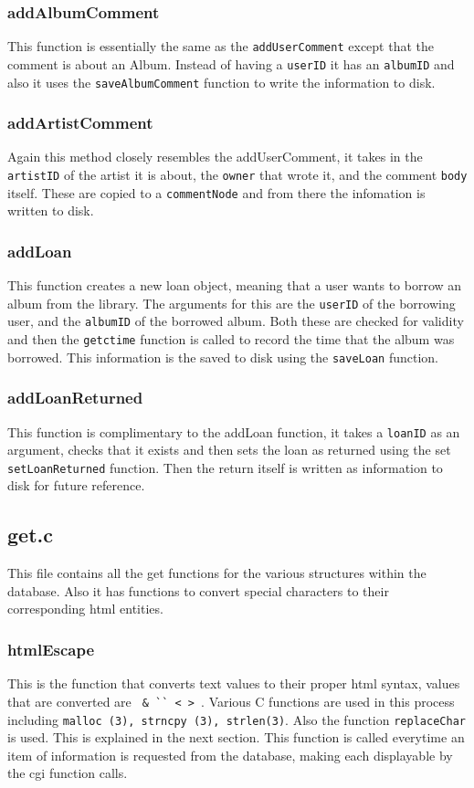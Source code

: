 \documentclass{article}
\begin{document}
\subsubsection*{addAlbumComment}
This function is essentially the same as the \verb|addUserComment| except that the comment is about an Album. Instead of having a \verb|userID| it has an \verb|albumID| and also it uses the \verb|saveAlbumComment| function to write the information to disk.

\subsubsection*{addArtistComment}
Again this method closely resembles the addUserComment, it takes in the \verb|artistID| of the artist it is about, the \verb|owner| that wrote it, and the comment \verb|body| itself. These are copied to a \verb|commentNode| and from there the infomation is written to disk.

\subsubsection*{addLoan}
This function creates a new loan object, meaning that a user wants to borrow an album from the library. The arguments for this are the \verb|userID| of the borrowing user, and the \verb|albumID| of the borrowed album. Both these are checked for validity and then the \verb|getctime| function is called to record the time that the album was borrowed. This information is the saved to disk using the \verb|saveLoan| function.

\subsubsection*{addLoanReturned}
This function is complimentary to the addLoan function, it takes a \verb|loanID| as an argument, checks that it exists and then sets the loan as returned using the set \verb|setLoanReturned| function. Then the return itself is written as information to disk for future reference.

\subsection{get.c}
This file contains all the get functions for the various structures within the database. Also it has functions to convert special characters to their corresponding html entities.

\subsubsection*{htmlEscape}
This is the function that converts text values to their proper html syntax, values that are converted are \verb| & `` < > |. Various C functions are used in this process including \verb|malloc (3), strncpy (3), strlen(3)|. Also the function \verb|replaceChar| is used. This is explained in the next section. This function is called everytime an item of information is requested from the database, making each displayable by the cgi function calls.
\end{document}
